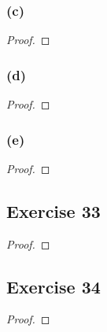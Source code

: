 \documentclass[14pt]{extarticle}
\begin{document}
\subsubsection{(c)}

\begin{proof}

\end{proof}

\subsubsection{(d)}

\begin{proof}

\end{proof}

\subsubsection{(e)}

\begin{proof}

\end{proof}

\subsection{Exercise 33}

\begin{proof}

\end{proof}

\subsection{Exercise 34}

\begin{proof}

\end{proof}
\end{document}
